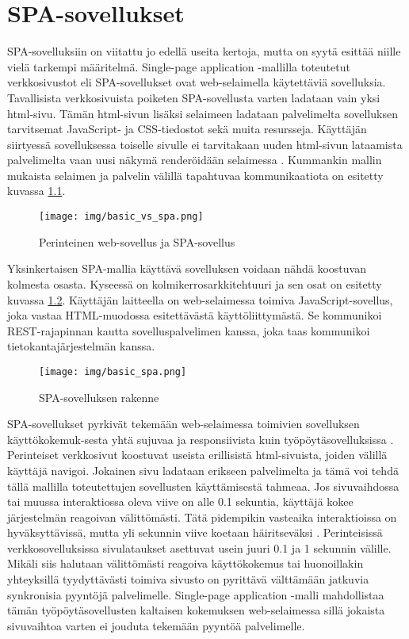 \documentclass[finnish,twoside,censored,csm,sw-track-2018]{HYthesisML}
\begin{document}
\chapter{SPA-sovellukset}
\label{chapter-spa}

SPA-sovelluksiin on viitattu jo edellä useita kertoja, mutta on syytä esittää niille vielä tarkempi määritelmä. Single-page application -mallilla toteutetut verkkosivustot eli SPA-sovellukset ovat web-selaimella käytettäviä sovelluksia. Tavallisista verkkosivuista poiketen SPA-sovellusta varten ladataan vain yksi html-sivu. Tämän html-sivun lisäksi selaimeen ladataan palvelimelta sovelluksen tarvitsemat JavaScript- ja CSS-tiedostot sekä muita resursseja. Käyttäjän siirtyessä sovelluksessa toiselle sivulle ei tarvitakaan uuden html-sivun lataamista palvelimelta vaan uusi näkymä renderöidään selaimessa \citep{ReactGlossary}. Kummankin mallin mukaista selaimen ja palvelin välillä tapahtuvaa kommunikaatiota on esitetty kuvassa \ref{fig-basic-vs-spa}.

\begin{figure}[ht]
  \centering
    \texttt{[image: img/basic\_vs\_spa.png]}
  \caption{Perinteinen web-sovellus ja SPA-sovellus}
  \label{fig-basic-vs-spa}
\end{figure}

Yksinkertaisen SPA-mallia käyttävä sovelluksen voidaan nähdä koostuvan kolmesta osasta. Kyseessä on kolmikerrosarkkitehtuuri ja sen osat on esitetty kuvassa \ref{fig-spa-rakenne}. Käyttäjän laitteella on web-selaimessa toimiva JavaScript-sovellus, joka vastaa HTML-muodossa esitettävästä käyttöliittymästä. Se kommunikoi REST-rajapinnan kautta sovelluspalvelimen kanssa, joka taas kommunikoi tietokantajärjestelmän kanssa.

\begin{figure}[ht]
  \centering
    \texttt{[image: img/basic\_spa.png]}
  \caption{SPA-sovelluksen rakenne}
  \label{fig-spa-rakenne}
\end{figure}

SPA-sovellukset pyrkivät tekemään web-selaimessa toimivien sovelluksen käyttökokemuk-sesta yhtä sujuvaa ja responsiivista kuin työpöytäsovelluksissa \citep{spa-jadhav}. Perinteiset verkkosivut koostuvat useista erillisistä html-sivuista, joiden välillä käyttäjä navigoi. Jokainen sivu ladataan erikseen palvelimelta ja tämä voi tehdä tällä mallilla toteutettujen sovellusten käyttämisestä tahmeaa. Jos sivuvaihdossa tai muussa interaktiossa oleva viive on alle 0.1 sekuntia, käyttäjä kokee järjestelmän reagoivan välittömästi. Tätä pidempikin vasteaika interaktioissa on hyväksyttävissä, mutta yli sekunnin viive koetaan häiritseväksi \citep{Nielsen}. Perinteisissä verkkosovelluksissa sivulataukset asettuvat usein juuri 0.1 ja 1 sekunnin välille. Mikäli siis halutaan välittömästi reagoiva käyttökokemus tai huonoillakin yhteyksillä tyydyttävästi toimiva sivusto on pyrittävä välttämään jatkuvia synkronisia pyyntöjä palvelimelle. Single-page application -malli mahdollistaa tämän työpöytäsovellusten kaltaisen kokemuksen web-selaimessa sillä jokaista sivuvaihtoa varten ei jouduta tekemään pyyntöä palvelimelle.
\end{document}

